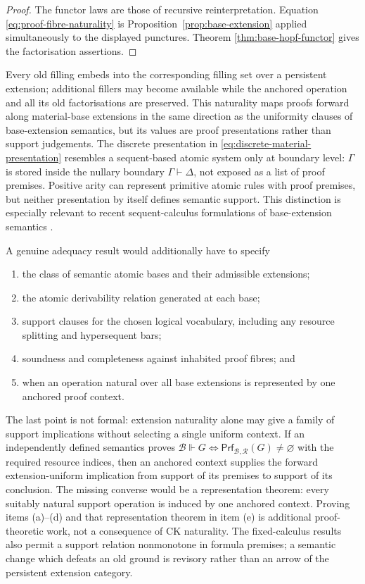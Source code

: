 \documentclass[10pt,a4paper]{article}
\theoremstyle{plain}
\theoremstyle{definition}
\theoremstyle{remark}
\newcommand{\Base}{\mathcal B}
\newcommand{\Rules}{\mathcal R}
\newcommand{\ms}{\mathrel{\vdash}}
\newcommand{\Prf}{\mathsf{Prf}}
\begin{document}
\begin{proof}
The functor laws are those of recursive reinterpretation.  Equation
\eqref{eq:proof-fibre-naturality} is Proposition~\ref{prop:base-extension}
applied simultaneously to the displayed punctures.  Theorem
\ref{thm:base-hopf-functor} gives the factorisation assertions.
\end{proof}

Every old filling embeds into the corresponding filling set over a
persistent extension; additional fillers may become available while the
anchored operation and all its old factorisations are preserved.  This
naturality maps proofs forward along material-base extensions in the same
direction as the uniformity clauses of base-extension semantics, but its
values are proof presentations rather than support judgements.  The
discrete presentation in \eqref{eq:discrete-material-presentation}
resembles a sequent-based atomic system only at boundary level:
\(\Gamma\) is stored inside the nullary boundary
\(\Gamma\ms\Delta\), not exposed as a list of proof premises.  Positive
arity can represent primitive atomic rules with proof premises, but neither
presentation by itself defines semantic support.  This distinction is
especially relevant to recent sequent-calculus formulations of
base-extension semantics
\cite{sandqvist2015,barrosonascimentopiotrovskapimentel2026,
gheorghiuGuPymIMLL,guGheorghiuPymBI}.

A genuine adequacy result would additionally have to specify
\begin{enumerate}[label=(\alph*)]
\item the class of semantic atomic bases and their admissible extensions;
\item the atomic derivability relation generated at each base;
\item support clauses for the chosen logical vocabulary, including any
resource splitting and hypersequent bars;
\item soundness and completeness against inhabited proof fibres; and
\item when an operation natural over all base extensions is represented by
one anchored proof context.
\end{enumerate}
The last point is not formal: extension naturality alone may give a family
of support implications without selecting a single uniform context.  If an
independently defined semantics proves
\(
\Base\Vdash G\Longleftrightarrow
\Prf_{\Base,\Rules}(G)\ne\varnothing
\)
with the required resource indices, then an anchored context supplies the
forward extension-uniform implication from support of its premises to
support of its conclusion.  The missing converse would be a representation
theorem: every suitably natural support operation is induced by one
anchored context.  Proving items (a)--(d) and that representation theorem
in item (e) is additional proof-theoretic work, not a consequence of CK
naturality.  The fixed-calculus results also permit a support relation
nonmonotone in formula premises; a semantic change which defeats an old
ground is revisory rather than an arrow of the persistent extension
category.
\end{document}
